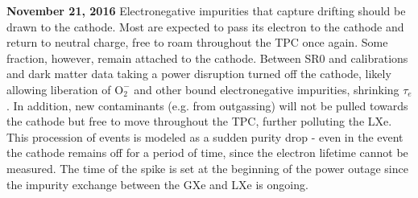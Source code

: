 \begin{table}
\centering
{}
\caption{Purity drops over the lifetime of XENON1T.  Dates and expected causes are given, along with detector region (GXe or LXe) impurity
release is thought to occur.  Cathode voltage and PTR power outages are given as they are believed to contribute to LXe and GXe
contaminations, respectively.}
\label{tab:electron_lifetime_model_detector_effects_spikes_dates}
\end{table}

\textbf{November 21, 2016}  Electronegative impurities that capture drifting \electron should be drawn to the cathode.  Most are
expected to pass its electron to the cathode and return to neutral charge, free to roam throughout the TPC once again.  Some fraction,
however, remain attached to the cathode.  Between SR0 \ambe and \metakr calibrations and dark matter data taking a power disruption
turned off the cathode, likely allowing liberation of $\mathrm{O_2^-}$ and other bound electronegative impurities, shrinking
$\tau_e$.  In addition, new contaminants (e.g. from outgassing) will not be pulled towards the cathode but free to move throughout the TPC,
further polluting the LXe.  This procession of events is modeled as a sudden purity drop - even in the event the cathode remains off for a
period of time, since the electron lifetime cannot be measured.  The time of the spike is set at the beginning of the power outage since
the impurity exchange between the GXe and LXe is ongoing.

